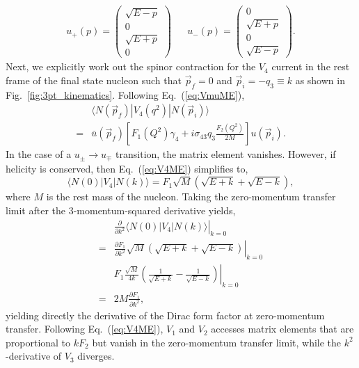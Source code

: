 \documentclass[prd,aps,twocolumn,superscriptaddress,tightenlines,nofootinbib,floatfix,preprintnumbers,10pt]{revtex4-1}
\begin{document}
\begin{align}
u_+(p)=\begin{pmatrix}
\sqrt{E-p}\\0\\ \sqrt{E+p}\\0
\end{pmatrix}
&&
u_-(p)=\begin{pmatrix}
0\\ \sqrt{E+p}\\0\\ \sqrt{E-p}
\end{pmatrix}.
\end{align}
Next, we explicitly work out the spinor contraction for the $V_4$ current in the rest frame of the final state nucleon such that $\vec{p}_f=0$ and $\vec{p}_i = -q_3\equiv k$ as shown in Fig.~\ref{fig:3pt_kinematics}. Following Eq.~(\ref{eq:VmuME}),
\begin{align}
&\langle N(\vec{p}_f) | V_4(q^2)|N(\vec{p}_i) \rangle\nonumber \\
= & \bar{u}(\vec{p}_f)\left[F_1(Q^2)\gamma_4 + i\sigma_{43}q_3\frac{F_2(Q^2)}{2M}\right]u(\vec{p}_i).
\label{eq:V4ME}
\end{align}
In the case of a $u_{\pm}\rightarrow u_{\mp}$ transition, the matrix element vanishes. However, if helicity is conserved, then Eq.~(\ref{eq:V4ME}) simplifies to,
\begin{equation}
\langle N(0) | V_4 | N(k) \rangle = F_1\sqrt{M}\left(\sqrt{E+k} + \sqrt{E-k}\right),
\end{equation}
where $M$ is the rest mass of the nucleon. Taking the zero-momentum transfer limit after the 3-momentum-squared derivative yields,
\begin{align}
&\left.\frac{\partial}{\partial k^2} \langle N(0) | V_4 | N(k) \rangle\right|_{k=0} \nonumber \\
= &\left.\frac{\partial F_1}{\partial k^2}\sqrt{M}\left(\sqrt{E+k} + \sqrt{E-k}\right)\right|_{k=0} \nonumber\\
& \left.F_1\frac{\sqrt{M}}{4k}\left(\frac{1}{\sqrt{E+k}} -\frac{1}{\sqrt{E-k}}  \right)\right|_{k=0}\nonumber \\
= & 2M \frac{\partial F_1}{\partial k^2},
\end{align}
yielding directly the derivative of the Dirac form factor at zero-momentum transfer. Following Eq.~(\ref{eq:V4ME}), $V_1$ and $V_2$ accesses matrix elements that are proportional to $kF_2$ but vanish in the zero-momentum transfer limit, while the $k^2$-derivative of $V_3$ diverges.
\end{document}
